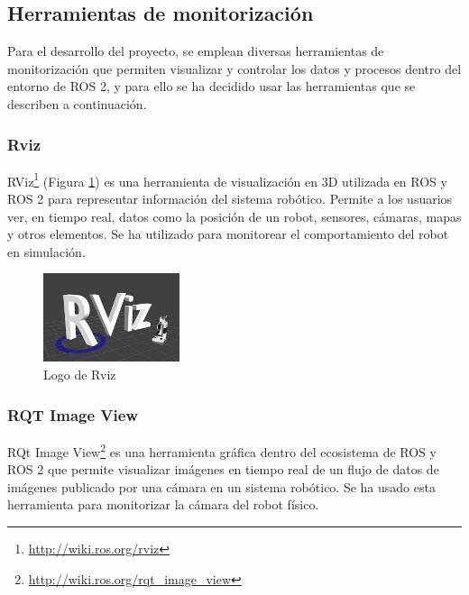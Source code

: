 
\subsection{Herramientas de monitorización}

Para el desarrollo del proyecto, se emplean diversas herramientas de monitorización que permiten visualizar y controlar los datos y procesos dentro del entorno de ROS 2, y para ello se ha decidido usar las herramientas que se describen a continuación.

\subsubsection{Rviz}

RViz\footnote{\url{http://wiki.ros.org/rviz}} (Figura \ref{fig:rviz}) es una herramienta de visualización en 3D utilizada en ROS y ROS 2 para representar información del sistema robótico. Permite a los usuarios ver, en tiempo real, datos como la posición de un robot, sensores, cámaras, mapas y otros elementos. Se ha utilizado para monitorear el comportamiento del robot en simulación.\\

\begin{figure} [h!]
	\begin{center}
		\includegraphics[width=4cm]{figs/rviz.png}
	\end{center}
	\caption{Logo de Rviz} %
	\label{fig:rviz}
\end{figure}


\subsubsection{RQT Image View}

RQt Image View\footnote{\url{http://wiki.ros.org/rqt_image_view}} es una herramienta gráfica dentro del ecosistema de ROS y ROS 2 que permite visualizar imágenes en tiempo real de un flujo de datos de imágenes publicado por una cámara en un sistema robótico. Se ha usado esta herramienta para monitorizar la cámara del robot físico.

